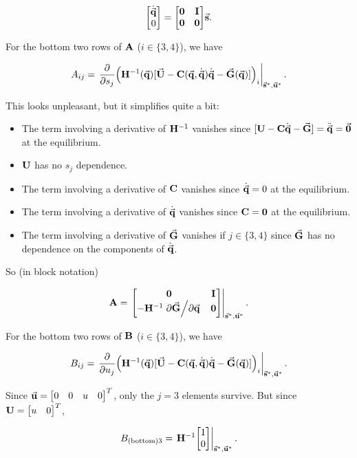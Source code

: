 \documentclass{article}
\begin{document}
    \[
        \mqty[\dot{\va{q}} \\ 0] = \mqty[\vb{0} & \vb{I} \\ \vb{0} & \vb{0}]\va{s}.
    \]

    For the bottom two rows of $\vb{A}$ ($i \in \{3, 4\}$), we have

    \[
        A_{ij} = \eval{\pdv{s_j}(\vb{H}^{-1}(\va{q})[\va{U} - \vb{C}(\va{q}, \dot{\va{q}})\dot{\va{q}} - \va{G}(\va{q})])_i}_{\va{s}^*, \va{u}^*}.
    \]

    This looks unpleasant, but it simplifies quite a bit:

    \begin{itemize}
        \item The term involving a derivative of $\vb{H}^{-1}$ vanishes since $[\vb{U} - \vb{C}\dot{\va{q}} - \va{G}] = \ddot{\va{q}} = \va{0}$ at the equilibrium.

        \item $\vb{U}$ has no $s_j$ dependence.

        \item The term involving a derivative of $\vb{C}$ vanishes since $\dot{\va{q}} = 0$ at the equilibrium.

        \item The term involving a derivative of $\dot{\va{q}}$ vanishes since $\vb{C} = \vb{0}$ at the equilibrium.

        \item The term involving a derivative of $\va{G}$ vanishes if $j \in \{3, 4\}$ since $\va{G}$ has no dependence on the components of $\dot{\va{q}}$.
    \end{itemize}

    So (in block notation)

    \[
        \vb{A} = \eval{\mqty[\vb{0} & \vb{I} \\ -\vb{H}^{-1}\pdv*{\va{G}}{\va{q}} & \vb{0}]}_{\va{s}^*, \va{u}^*}.
    \]

    For the bottom two rows of $\vb{B}$ ($i \in \{3, 4\}$), we have

    \[
        B_{ij} = \eval{\pdv{u_j}(\vb{H}^{-1}(\va{q})[\va{U} - \vb{C}(\va{q}, \dot{\va{q}})\dot{\va{q}} - \va{G}(\va{q})])_i}_{\va{s}^*, \va{u}^*}.
    \]

    Since $\va{u} = \mqty[0 & 0 & u & 0]^T$, only the $j = 3$ elements survive.
    But since $\vb{U} = \mqty[u & 0]^T$,

    \[
        B_{(\text{bottom})3} = \eval{\vb{H}^{-1}\mqty[1 \\ 0]}_{\va{s}^*, \va{u}^*}.
    \]
\end{document}
